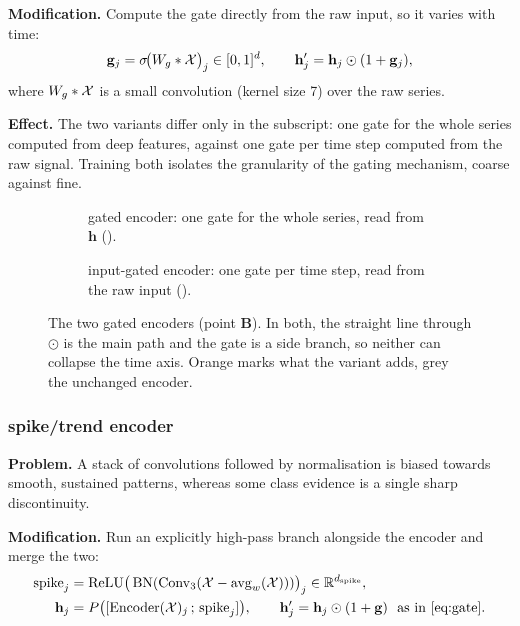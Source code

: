 \textbf{Modification.} Compute the gate directly from the raw input, so it varies with time:
\begin{equation}
  \mathbf{g}_j = \sigma\!\big(W_g \ast \mathcal{X}\big)_j \in [0,1]^{d},
  \qquad
  \mathbf{h}'_j = \mathbf{h}_j \odot (1 + \mathbf{g}_j) ,
  \label{eq:input_gate}
\end{equation}
where $W_g \ast \mathcal{X}$ is a small convolution (kernel size 7) over the raw series.

\textbf{Effect.} The two variants differ only in the subscript: one gate for the whole series
computed from deep features, against one gate per time step computed from the raw signal. Training
both isolates the granularity of the gating mechanism, coarse against fine.

\begin{figure}[htbp]
  \centering
  \begin{subfigure}[t]{0.49\linewidth}
    \centering
    
    \caption{\seanet{} gated encoder: one gate for the whole series, read from $\mathbf{h}$
    ().}
    \label{fig:var_gated}
  \end{subfigure}\hfill
  \begin{subfigure}[t]{0.49\linewidth}
    \centering
    
    \caption{\seanet{} input-gated encoder: one gate per time step, read from the raw input
    ().}
    \label{fig:var_inputgate}
  \end{subfigure}
  \caption{The two gated \seanet{} encoders (point \textbf{B}). In both, the straight line through
  $\odot$ is the main path and the gate is a side branch, so neither can collapse the time axis.
  Orange marks what the variant adds, grey the unchanged encoder.}
  \label{fig:var_gates}
\end{figure}

\subsubsection{\seanet{} spike/trend encoder}
\label{sec:var:spiketrend}

\textbf{Problem.} A stack of convolutions followed by normalisation is biased towards smooth,
sustained patterns, whereas some class evidence is a single sharp discontinuity.

\textbf{Modification.} Run an explicitly high-pass branch alongside the encoder and merge the two:
\begin{align}
  \text{spike}_j &= \operatorname{ReLU}\!\big(\operatorname{BN}(\operatorname{Conv}_3(
  \bag - \operatorname{avg}_w(\bag)))\big)_j \in \R^{d_{\text{spike}}} ,
  \label{eq:spike_branch}\\
  \mathbf{h}_j &= P\big([\text{Encoder}(\bag)_j \,;\, \text{spike}_j]\big),
  \qquad
  \mathbf{h}'_j = \mathbf{h}_j \odot (1 + \mathbf{g}) \ \text{ as in \Cref{eq:gate}} .
  \label{eq:spike_mix}
\end{align}

